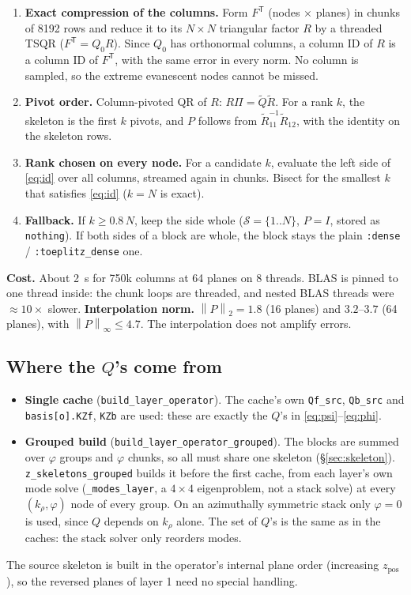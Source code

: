 \documentclass[11pt,a4paper]{article}
\newcommand{\code}[1]{\texttt{#1}}
\newcommand{\norm}[1]{\left\lVert #1 \right\rVert}
\theoremstyle{remark}
\begin{document}
\begin{enumerate}[leftmargin=*]
\item \textbf{Exact compression of the columns.} Form $F^{\mathsf T}$ (nodes $\times$ planes) in chunks of 8192 rows and reduce it to its
  $N\times N$ triangular factor $R$ by a threaded TSQR ($F^{\mathsf T} = Q_0R$). Since $Q_0$ has orthonormal columns,
  a column ID of $R$ is a column ID of $F^{\mathsf T}$, with the same error in every norm. No column is
  sampled, so the extreme evanescent nodes cannot be missed.
\item \textbf{Pivot order.} Column-pivoted QR of $R$: $R\Pi = \widetilde Q\widetilde R$. For a rank $k$, the skeleton is the
  first $k$ pivots, and $P$ follows from $\widetilde R_{11}^{-1}\widetilde R_{12}$, with the identity on the skeleton rows.
\item \textbf{Rank chosen on every node.} For a candidate $k$, evaluate the left side of \eqref{eq:id} over all columns,
  streamed again in chunks. Bisect for the smallest $k$ that satisfies \eqref{eq:id} ($k=N$ is exact).
\item \textbf{Fallback.} If $k\ge0.8\,N$, keep the side whole ($\mathcal S=\{1..N\}$, $P=I$, stored as \code{nothing}).
  If both sides of a block are whole, the block stays the plain \code{:dense} / \code{:toeplitz\_dense} one.
\end{enumerate}
\textbf{Cost.} About 2~s for 750k columns at 64 planes on 8 threads. BLAS is pinned to one thread inside: the
chunk loops are threaded, and nested BLAS threads were $\approx10\times$ slower.
\textbf{Interpolation norm.} $\norm{P}_2 = 1.8$ (16 planes) and $3.2$--$3.7$ (64 planes), with $\norm{P}_\infty\le 4.7$. The
interpolation does not amplify errors.

\subsection{Where the $Q$'s come from}

\begin{itemize}[leftmargin=*]
\item \textbf{Single cache} (\code{build\_layer\_operator}). The cache's own \code{Qf\_src}, \code{Qb\_src} and
  \code{basis[o].KZf}, \code{KZb} are used: these are exactly the $Q$'s in \eqref{eq:psi}--\eqref{eq:phi}.
\item \textbf{Grouped build} (\code{build\_layer\_operator\_grouped}). The blocks are summed over $\varphi$ groups and $\varphi$ chunks, so
  all must share one skeleton (\S\ref{sec:skeleton}). \code{z\_skeletons\_grouped} builds it before the first cache, from
  each layer's own mode solve (\code{\_modes\_layer}, a $4\times4$ eigenproblem, not a stack solve) at every $(k_\rho,\varphi)$
  node of every group. On an azimuthally symmetric stack only $\varphi=0$ is used, since $Q$ depends on $k_\rho$ alone.
  The set of $Q$'s is the same as in the caches: the stack solver only reorders modes.
\end{itemize}
The source skeleton is built in the operator's internal plane order (increasing $z_{\mathrm{pos}}$), so the
reversed planes of layer 1 need no special handling.
\end{document}

